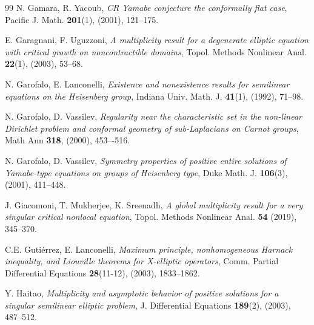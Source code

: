 \documentclass[11pt]{amsart}
\numberwithin{equation}{section} %
\theoremstyle{definition}
\begin{document}
\begin{thebibliography}{99}
	N. Gamara, R. Yacoub, 
	{\em CR Yamabe conjecture the conformally flat case}, 
	Pacific J. Math. {\bf 201}(1), (2001), 121--175.
	
	E. Garagnani, F. Uguzzoni, 
	{\em A multiplicity result for a degenerate elliptic equation with critical growth on noncontractible domains}, 
	Topol. Methods Nonlinear Anal. {\bf 22}(1), (2003), 53--68.
	
	
	N. Garofalo, E. Lanconelli, 
	{\em Existence and nonexistence results for
		semilinear equations on the Heisenberg group},
	Indiana Univ. Math. J. {\bf 41}(1), (1992), 71--98.

	N. Garofalo, D. Vassilev, 
	{\em Regularity near the characteristic set in the non-linear Dirichlet problem and conformal geometry of sub-Laplacians on Carnot groups}, 
	Math Ann {\bf 318}, (2000), 453–-516.
	
	
	N. Garofalo, D. Vassilev, 
	{\em Symmetry properties of positive entire solutions of Yamabe-type equations on groups of Heisenberg type}, Duke Math. J. {\bf 106}(3), (2001), 411--448.
	
	J. Giacomoni, T. Mukherjee, K. Sreenadh, 
	{\em A global multiplicity result for a very singular critical nonlocal equation}, 
	Topol. Methods Nonlinear Anal. {\bf 54} (2019), 345--370.
	
	
	
	
	C.E. Guti\'{e}rrez, E. Lanconelli,
	{\em Maximum principle, nonhomogeneous Harnack inequality, and Liouville theorems for  X-elliptic operators},	
	Comm. Partial Differential Equations {\bf 28}(11-12), (2003), 1833--1862.
	
	Y. Haitao,
	{\em Multiplicity and asymptotic behavior of positive solutions for a singular semilinear elliptic problem},
	J. Differential Equations {\bf 189}(2), (2003), 487--512.
	

\end{thebibliography}
\end{document}
